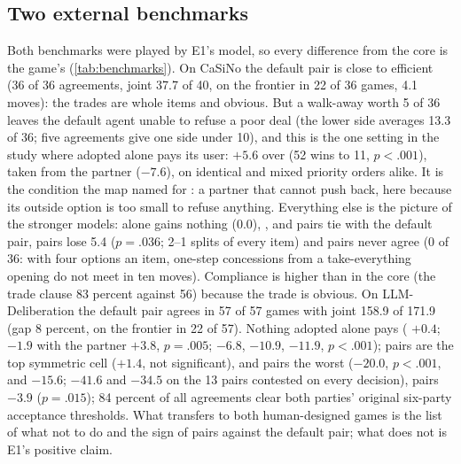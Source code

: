 \subsection{Two external benchmarks}
\label{sec:benchmarks}
Both benchmarks were played by E1's model, so every difference from the core is the game's (\cref{tab:benchmarks}). On CaSiNo the default pair is close to efficient (36 of 36 agreements, joint 37.7 of 40, on the frontier in 22 of 36 games, 4.1 moves): the trades are whole items and obvious. But a walk-away worth 5 of 36 leaves the default agent unable to refuse a poor deal (the lower side averages 13.3 of 36; five agreements give one side under 10), and this is the one setting in the study where \competing{} adopted alone pays its user: $+5.6$ over \neutral{} (52 wins to 11, $p < .001$), taken from the partner ($-7.6$), on identical and mixed priority orders alike. It is the condition the map named for \competing{}: a partner that cannot push back, here because its outside option is too small to refuse anything. Everything else is the picture of the stronger models: \collaborating{} alone gains nothing (0.0), \collaborating, \accommodating{} and \avoiding{} pairs tie with the default pair, \compromising{} pairs lose 5.4 ($p = .036$; 2--1 splits of every item) and \competing{} pairs never agree (0 of 36: with four options an item, one-step concessions from a take-everything opening do not meet in ten moves). Compliance is higher than in the core (the \collaborating{} trade clause 83 percent against 56) because the trade is obvious. On LLM-Deliberation the default pair agrees in 57 of 57 games with joint 158.9 of 171.9 (gap 8 percent, on the frontier in 22 of 57). Nothing adopted alone pays (\competing{} $+0.4$; \collaborating{} $-1.9$ with the partner $+3.8$, $p = .005$; \compromising{} $-6.8$, \accommodating{} $-10.9$, \avoiding{} $-11.9$, $p < .001$); \collaborating{} pairs are the top symmetric cell ($+1.4$, not significant), \avoiding{} and \competing{} pairs the worst ($-20.0$, $p < .001$, and $-15.6$; $-41.6$ and $-34.5$ on the 13 pairs contested on every decision), \accommodating{} pairs $-3.9$ ($p = .015$); 84 percent of all agreements clear both parties' original six-party acceptance thresholds. What transfers to both human-designed games is the list of what not to do and the sign of \collaborating{} pairs against the default pair; what does not is E1's positive claim.

